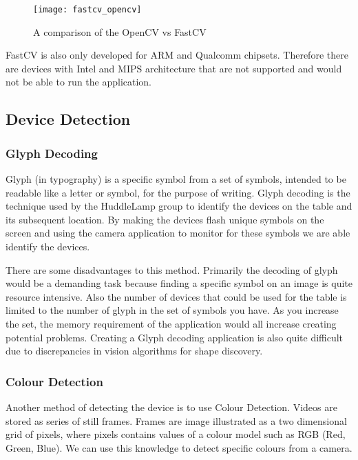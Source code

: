 \begin{figure}[H]
    \centering
    \texttt{[image: fastcv\_opencv]}
    \caption{A comparison of the OpenCV vs FastCV \cite{fastcv_opencv}}
    \label{opencv_fastcv}
\end{figure}

FastCV is also only developed for ARM and Qualcomm chipsets. Therefore there are devices with Intel and MIPS architecture that are not supported and would not be able to run the application.

\subsection{Device Detection} \label{device_identification}

\subsubsection{Glyph Decoding}
Glyph (in typography) is a specific symbol from a set of symbols, intended to be readable like a letter or symbol, for the purpose of writing\cite{glyph-wiki}. Glyph decoding is the technique used by the HuddleLamp group to identify the devices on the table and its subsequent location\cite{huddlelamp-paper}. By making the devices flash unique symbols on the screen and using the camera application to monitor for these symbols we are able identify the devices. 

There are some disadvantages to this method. Primarily the decoding of glyph would be a demanding task because finding a specific symbol on an image is quite resource intensive. Also the number of devices that could be used for the table is limited to the number of glyph in the set of symbols you have. As you increase the set, the memory requirement of the application would all increase creating potential problems. Creating a Glyph decoding application is also quite difficult due to discrepancies in vision algorithms for shape discovery\cite{shape_recognition}.
\subsubsection{Colour Detection}
Another method of detecting the device is to use Colour Detection. Videos are stored as series of still frames\cite{video-wiki}. Frames are image illustrated as a two dimensional grid of pixels, where pixels contains values of a colour model such as RGB (Red, Green, Blue). We can use this knowledge to detect specific colours from a camera.

